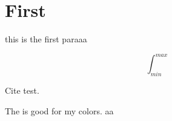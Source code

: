 \section{First}

this is the first paraaa 

\[
  \int_{min}^{max} 
\]


Cite test.


The  is good  for my colors. aa